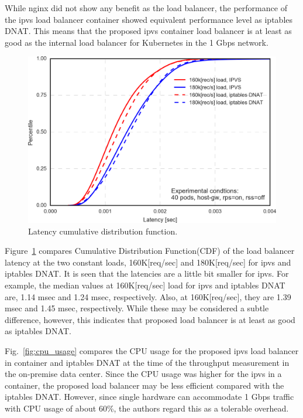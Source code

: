While nginx did not show any benefit as the load balancer, the performance of the ipvs load balancer container showed equivalent performance level as iptables DNAT.
This means that the proposed ipvs container load balancer is at least as good as the internal load balancer for Kubernetes in the 1 Gbps network.

\begin{figure}[h]
  \centering
  \includegraphics[width=0.8\columnwidth]{Figs/latency_cdf_rps_40pods}
  \par\bigskip
  \centering
  \begin{minipage}{0.8\columnwidth}
    \caption{Latency cumulative distribution function.}
    \label{fig:latency_cdf_rps_40pods}
  \end{minipage}
\end{figure}

Figure~\ref{fig:latency_cdf_rps_40pods} compares Cumulative Distribution Function(CDF) of the load balancer latency at the two constant loads, 160K[req/sec] and 180K[req/sec] for ipvs and iptables DNAT.
It is seen that the latencies are a little bit smaller for ipvs.
For example, the median values at 160K[req/sec] load for ipvs and iptables DNAT are, 1.14 msec and 1.24 msec, respectively.
Also, at 160K[req/sec], they are 1.39 msec and 1.45 msec, respectively.
%
While these may be considered a subtle difference, however, this indicates that proposed load balancer is at least as good as iptables DNAT.

Fig.~\ref{fig:cpu_usage} compares the CPU usage for the proposed ipvs load balancer in container and iptables DNAT at the time of the throughput measurement in the on-premise data center.
Since the CPU usage was higher for the ipvs in a container, the proposed load balancer may be less efficient compared with the iptables DNAT.
However, since single hardware can accommodate 1 Gbps traffic with CPU usage of about 60\%, the authors regard this as a tolerable overhead.

